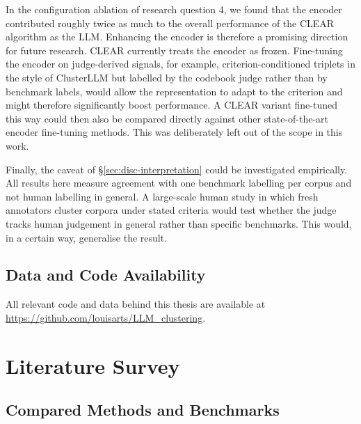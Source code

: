 \documentclass[11pt,a4paper,oneside]{report}
\begin{document}
In the configuration ablation of research question 4, we found that the encoder contributed roughly twice as much to the overall performance of the CLEAR algorithm as the LLM. Enhancing the encoder is therefore a promising direction for future research. CLEAR currently treats the encoder as frozen. Fine-tuning
the encoder on judge-derived signals, for example, criterion-conditioned triplets in the style of ClusterLLM but labelled by the codebook judge rather than by benchmark labels,
would allow the representation to adapt to the criterion and might therefore significantly boost performance. A CLEAR variant fine-tuned this way could then also be compared directly
against other state-of-the-art encoder fine-tuning methods. This was deliberately left out of the scope in this work. 


Finally, the caveat of \S\ref{sec:disc-interpretation} could be investigated empirically. All results here measure agreement with one benchmark labelling per corpus and not human labelling in general. A large-scale human study in which fresh annotators cluster corpora under stated criteria would
test whether the judge tracks human judgement in general rather than specific benchmarks. This would, in a certain way, generalise the result.





\section*{Data and Code Availability}

All relevant code and data behind this thesis are available at
\url{https://github.com/louisarts/LLM_clustering}.


\clearpage


\clearpage
\appendix

\chapter{Literature Survey}\label{app:litstat}

\section{Compared Methods and Benchmarks}\label{app:roster}
\end{document}
